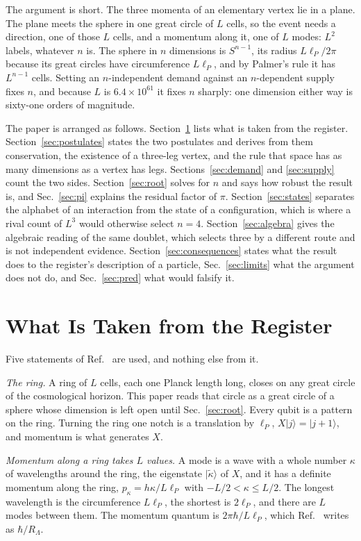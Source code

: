 \documentclass[aps,prd,twocolumn,superscriptaddress,nofootinbib]{revtex4-2}
\begin{document}
The argument is short. The three momenta of an elementary vertex lie in a plane. The plane meets the sphere in one great circle of $L$ cells, so the event needs a direction, one of those $L$ cells, and a momentum along it, one of $L$ modes: $L^2$ labels, whatever $n$ is. The sphere in $n$ dimensions is $S^{n-1}$, its radius $L\ell_P/2\pi$ because its great circles have circumference $L\ell_P$, and by Palmer's rule it has $L^{n-1}$ cells. Setting an $n$-independent demand against an $n$-dependent supply fixes $n$, and because $L$ is $6.4\times10^{61}$ it fixes $n$ sharply: one dimension either way is sixty-one orders of magnitude.

The paper is arranged as follows. Section~\ref{sec:register} lists what is taken from the register. Section~\ref{sec:postulates} states the two postulates and derives from them conservation, the existence of a three-leg vertex, and the rule that space has as many dimensions as a vertex has legs. Sections~\ref{sec:demand} and \ref{sec:supply} count the two sides. Section~\ref{sec:root} solves for $n$ and says how robust the result is, and Sec.~\ref{sec:pi} explains the residual factor of $\pi$. Section~\ref{sec:states} separates the alphabet of an interaction from the state of a configuration, which is where a rival count of $L^3$ would otherwise select $n = 4$. Section~\ref{sec:algebra} gives the algebraic reading of the same doublet, which selects three by a different route and is not independent evidence. Section~\ref{sec:consequences} states what the result does to the register's description of a particle, Sec.~\ref{sec:limits} what the argument does not do, and Sec.~\ref{sec:pred} what would falsify it.

\section{What Is Taken from the Register}
\label{sec:register}

Five statements of Ref.~\cite{korytko2026c} are used, and nothing else from it.

\textit{The ring.} A ring of $L$ cells, each one Planck length long, closes on any great circle of the cosmological horizon. This paper reads that circle as a great circle of a sphere whose dimension is left open until Sec.~\ref{sec:root}. Every qubit is a pattern on the ring. Turning the ring one notch is a translation by $\ell_P$, $X|j\rangle = |j+1\rangle$, and momentum is what generates $X$.

\textit{Momentum along a ring takes $L$ values.} A mode is a wave with a whole number $\kappa$ of wavelengths around the ring, the eigenstate $|\tilde\kappa\rangle$ of $X$, and it has a definite momentum along the ring, $p_\kappa = h\kappa/L\ell_P$ with $-L/2 < \kappa \le L/2$. The longest wavelength is the circumference $L\ell_P$, the shortest is $2\ell_P$, and there are $L$ modes between them. The momentum quantum is $2\pi\hbar/L\ell_P$, which Ref.~\cite{korytko2026c} writes as $\hbar/R_\Lambda$.
\end{document}
